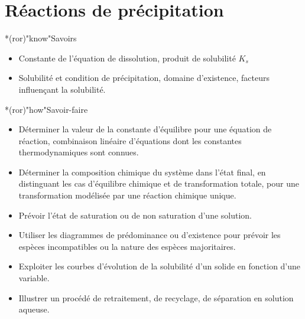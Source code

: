\documentclass[../../main/main.tex]{subfiles}
\begin{document}
\setcounter{chapter}{4}


\chapter{R\'eactions de précipitation}

\vspace*{\fill}

\begin{prgm}
	\begin{tcb}*(ror)"know"{Savoirs}
		\begin{itemize}
			\item Constante de l'équation de dissolution, produit de solubilité $K_s$
			\item Solubilité et condition de précipitation, domaine d'existence,
			      facteurs influençant la solubilité.
		\end{itemize}
	\end{tcb}
	\begin{tcb}*(ror)"how"{Savoir-faire}
		\begin{itemize}
			\item Déterminer la valeur de la constante d'équilibre pour une équation
			      de réaction, combinaison linéaire d'équations dont les constantes
			      thermodynamiques sont connues.
			\item Déterminer la composition chimique du système dans l'état final, en
			      distinguant les cas d'équilibre chimique et de transformation totale,
			      pour une transformation modélisée par une réaction chimique unique.
			\item Prévoir l'état de saturation ou de non saturation d'une solution.
			\item Utiliser les diagrammes de prédominance ou d'existence pour prévoir
			      les espèces incompatibles ou la nature des espèces majoritaires.
			\item Exploiter les courbes d'évolution de la solubilité d'un solide en
			      fonction d'une variable.
			\item Illustrer un procédé de retraitement, de recyclage, de séparation
			      en solution aqueuse.
		\end{itemize}
	\end{tcb}
\end{prgm}

\vspace*{\fill}
\minitoc
\vspace*{\fill}
\end{document}
